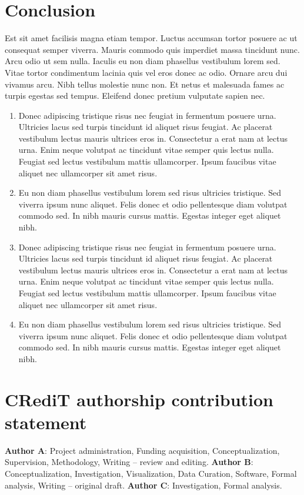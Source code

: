 \documentclass[11pt]{article}
\begin{document}
\section{Conclusion}

\par Est sit amet facilisis magna etiam tempor. Luctus accumsan tortor posuere ac ut consequat semper viverra. Mauris commodo quis imperdiet massa tincidunt nunc. Arcu odio ut sem nulla. Iaculis eu non diam phasellus vestibulum lorem sed. Vitae tortor condimentum lacinia quis vel eros donec ac odio. Ornare arcu dui vivamus arcu. Nibh tellus molestie nunc non. Et netus et malesuada fames ac turpis egestas sed tempus. Eleifend donec pretium vulputate sapien nec.
\begin{enumerate}
  \item Donec adipiscing tristique risus nec feugiat in fermentum posuere urna. Ultricies lacus sed turpis tincidunt id aliquet risus feugiat. Ac placerat vestibulum lectus mauris ultrices eros in. Consectetur a erat nam at lectus urna. Enim neque volutpat ac tincidunt vitae semper quis lectus nulla. Feugiat sed lectus vestibulum mattis ullamcorper. Ipsum faucibus vitae aliquet nec ullamcorper sit amet risus. 
  \item Eu non diam phasellus vestibulum lorem sed risus ultricies tristique. Sed viverra ipsum nunc aliquet. Felis donec et odio pellentesque diam volutpat commodo sed. In nibh mauris cursus mattis. Egestas integer eget aliquet nibh. 
  \item Donec adipiscing tristique risus nec feugiat in fermentum posuere urna. Ultricies lacus sed turpis tincidunt id aliquet risus feugiat. Ac placerat vestibulum lectus mauris ultrices eros in. Consectetur a erat nam at lectus urna. Enim neque volutpat ac tincidunt vitae semper quis lectus nulla. Feugiat sed lectus vestibulum mattis ullamcorper. Ipsum faucibus vitae aliquet nec ullamcorper sit amet risus. 
  \item Eu non diam phasellus vestibulum lorem sed risus ultricies tristique. Sed viverra ipsum nunc aliquet. Felis donec et odio pellentesque diam volutpat commodo sed. In nibh mauris cursus mattis. Egestas integer eget aliquet nibh. 
\end{enumerate}

\section*{CRediT authorship contribution statement}

\noindent 
\textbf{Author A}: Project administration, Funding acquisition, Conceptualization, Supervision, Methodology, Writing – review and editing. \textbf{Author B}: Conceptualization, Investigation, Visualization, Data Curation, Software, Formal analysis, Writing – original draft. \textbf{Author C}: Investigation, Formal analysis.
\end{document}
